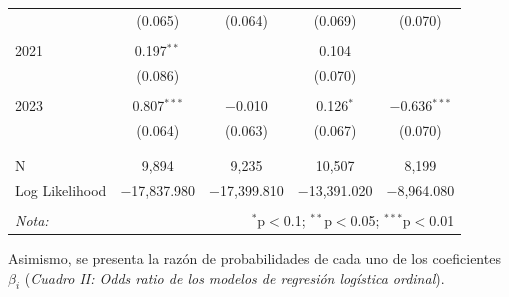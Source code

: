 \documentclass[letterpaper]{article}
\begin{document}
\begin{table}[!htbp]
\begin{tabular}{@{\extracolsep{5pt}}lcccc}
  & (0.065) & (0.064) & (0.069) & (0.070) \\ 
  & & & & \\ 
 2021 & 0.197$^{**}$ &  & 0.104 &  \\ 
  & (0.086) &  & (0.070) &  \\ 
  & & & & \\ 
 2023 & 0.807$^{***}$ & $-$0.010 & 0.126$^{*}$ & $-$0.636$^{***}$ \\ 
  & (0.064) & (0.063) & (0.067) & (0.070) \\ 
  & & & & \\ 
\hline \\[-1.8ex] 
N & 9,894 & 9,235 & 10,507 & 8,199 \\ 
Log Likelihood & $-$17,837.980 & $-$17,399.810 & $-$13,391.020 & $-$8,964.080 \\ 
\hline 
\hline \\[-1.8ex] 
\textit{Nota:}  & \multicolumn{4}{r}{$^{*}$p$<$0.1; $^{**}$p$<$0.05; $^{***}$p$<$0.01} \\ 
\end{tabular} 
\end{table}

Asimismo, se presenta la razón de probabilidades de cada uno de los coeficientes $\beta_i$ (\emph{Cuadro II: Odds ratio de los modelos de regresión logística ordinal}).\\ 
\end{document}

